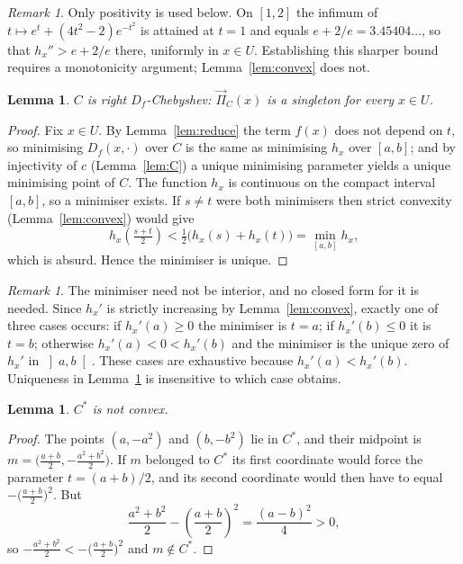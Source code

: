\documentclass[11pt]{amsart}
\theoremstyle{plain}
\newtheorem{lemma}[theorem]{Lemma}
\theoremstyle{definition}
\theoremstyle{remark}
\newtheorem{remark}[theorem]{Remark}
\newcommand{\D}{D_f}
\newcommand{\Proj}{\overrightarrow{\Pi}}
\newcommand{\Cstar}{C^{*}}
\begin{document}
\begin{remark}\label{rem:sharp}
Only positivity is used below. On $[1,2]$ the infimum of
$t \mapsto e^{t} + (4t^{2} - 2)e^{-t^{2}}$ is attained at $t = 1$ and equals
$e + 2/e = 3.45404\ldots$, so that $h_{x}'' > e + 2/e$ there, uniformly in
$x \in U$. Establishing this sharper bound requires a monotonicity argument;
Lemma~\ref{lem:convex} does not.
\end{remark}

\begin{lemma}\label{lem:cheb}
$C$ is right $\D$-Chebyshev: $\Proj_{C}(x)$ is a singleton for every $x \in U$.
\end{lemma}

\begin{proof}
Fix $x \in U$. By Lemma~\ref{lem:reduce} the term $f(x)$ does not depend on $t$,
so minimising $\D(x, \cdot)$ over $C$ is the same as minimising $h_{x}$ over
$[a,b]$; and by injectivity of $c$ (Lemma~\ref{lem:C}) a unique minimising
parameter yields a unique minimising point of $C$. The function $h_{x}$ is
continuous on the compact interval $[a,b]$, so a minimiser exists. If $s \neq t$
were both minimisers then strict convexity (Lemma~\ref{lem:convex}) would give
\[
  h_{x}\!\left( \tfrac{s+t}{2} \right)
  < \tfrac{1}{2}\bigl( h_{x}(s) + h_{x}(t) \bigr)
  = \min_{[a,b]} h_{x},
\]
which is absurd. Hence the minimiser is unique.
\end{proof}

\begin{remark}\label{rem:endpoint}
The minimiser need not be interior, and no closed form for it is needed. Since
$h_{x}'$ is strictly increasing by Lemma~\ref{lem:convex}, exactly one of three
cases occurs: if $h_{x}'(a) \ge 0$ the minimiser is $t = a$; if
$h_{x}'(b) \le 0$ it is $t = b$; otherwise $h_{x}'(a) < 0 < h_{x}'(b)$ and the
minimiser is the unique zero of $h_{x}'$ in $\left]a,b\right[$. These cases are
exhaustive because $h_{x}'(a) < h_{x}'(b)$. Uniqueness in
Lemma~\ref{lem:cheb} is insensitive to which case obtains.
\end{remark}

\begin{lemma}\label{lem:nonconvex}
$\Cstar$ is not convex.
\end{lemma}

\begin{proof}
The points $(a, -a^{2})$ and $(b, -b^{2})$ lie in $\Cstar$, and their midpoint is
$m = \bigl( \tfrac{a+b}{2}, -\tfrac{a^{2}+b^{2}}{2} \bigr)$. If $m$ belonged to
$\Cstar$ its first coordinate would force the parameter $t = (a+b)/2$, and its
second coordinate would then have to equal $-\bigl( \tfrac{a+b}{2} \bigr)^{2}$.
But
\[
  \frac{a^{2}+b^{2}}{2} - \left( \frac{a+b}{2} \right)^{2}
  = \frac{(a-b)^{2}}{4} > 0 ,
\]
so $-\tfrac{a^{2}+b^{2}}{2} < -\bigl( \tfrac{a+b}{2} \bigr)^{2}$ and
$m \notin \Cstar$.
\end{proof}
\end{document}
